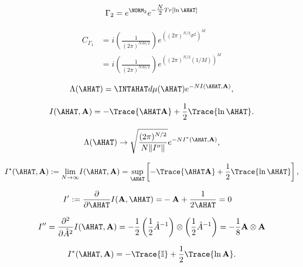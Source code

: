 \begin{align}
\label{eqn:log-Gamma}
\Gamma_2 = e^{\NORM_2} e^{ -\tfrac{N}{2} Tr[ \ln\AHAT ] } 
\end{align}

\begin{align}
  \label{eqn:CGamma1}
  C_{\Gamma_1}
  &= i \left(\frac{1}{(2\pi)^{NM/2}}\right) e^{\left((2\pi)^{N/2} \sigma^2\right)^M} \\ \nonumber
 &= i \left(\frac{1}{(2\pi)^{NM/2}}\right) e^{\left((2\pi)^{N/2}(1/M)\right)^M}
\end{align}

\begin{align}
\label{eqn:LambdaA}
\Lambda(\AHAT)=\INTAHAT  d\mu(\AHAT) e^{-NI(\AHAT,\mathbf{A})}  ,
\end{align}

\begin{align}
\label{eqn:IAA}
I(\AHAT,\mathbf{A}) = -\Trace{ \AHAT\mathbf{A} } + \frac{1}{2}\Trace{ \ln\AHAT }  .
\end{align}

\begin{align}
\label{eqn:LAMBDA}
\Lambda(\AHAT)\rightarrow \sqrt{\dfrac{(2\pi)^{N/2}}{N\Vert I''\Vert}}e^{-N I^{*}(\AHAT, \mathbf{A})}  ,
\end{align}

\begin{align}
  \label{eqn:IAA-sup}
  I^{*}(\AHAT,\mathbf{A}) :=
\underset{N\rightarrow\infty}{\lim} I(\AHAT,\mathbf{A}) =
 \underset{\AHAT}{\sup}\left[-\Trace{\AHAT\mathbf{A}}+\frac{1}{2}\Trace{\ln\AHAT}\right]  ,
\end{align}

\begin{align}
  \label{eqn:SP0}
  I':=   \dfrac{\partial}{\partial\AHAT}I(\mathbf{A},\AHAT) =& -\mathbf{A}+\dfrac{1}{2\AHAT}=0  
\end{align}

\begin{align}
  \label{eqn:Ixx}
I''=\frac{\partial^2 }{\partial \hat{A}^2} I(\AHAT,\mathbf{A})= -\frac{1}{2} \left( \frac{1}{2} \hat{A}^{-1} \right) \otimes \left( \frac{1}{2} \hat{A}^{-1} \right) = -\frac{1}{8} \mathbf{A} \otimes \mathbf{A}
\end{align}

\begin{align}
\label{eqn:IAA_2}
I^{*}(\AHAT,\mathbf{A}) = -\Trace{ \mathbb{I} } + \frac{1}{2}\Trace{ \ln\mathbf{A} }  .
\end{align}

